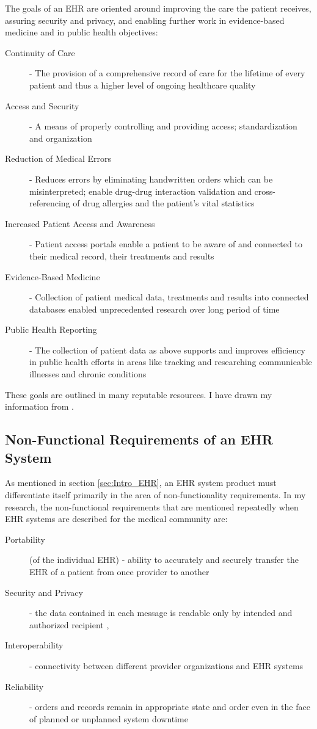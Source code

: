 \documentclass[10pt]{article}
\begin{document}
The goals of an EHR are oriented around improving the care the patient receives, assuring security and privacy, and enabling further work in evidence-based medicine and in public health objectives: 
\begin{description}
\item[Continuity of Care] - The provision of a comprehensive record of care for the lifetime of every patient and thus a higher level of ongoing healthcare quality
\item[Access and Security] - A means of properly controlling and providing access; standardization and organization
\item[Reduction of Medical Errors] - Reduces errors by eliminating handwritten orders which can be misinterpreted; enable drug-drug interaction validation and cross-referencing of drug allergies and the patient's vital statistics
\item[Increased Patient Access and Awareness] - Patient access portals enable a patient to be aware of and connected to their medical record, their treatments and results
\item[Evidence-Based Medicine] - Collection of patient medical data, treatments and results into connected databases enabled unprecedented research over long period of time
\item[Public Health Reporting] - The collection of patient data as above supports and improves efficiency in public health efforts in areas like tracking and researching communicable illnesses and chronic conditions
\end{description}

These goals are outlined in many reputable resources. I have drawn my information from \cite{ehrbook}.

\subsection{Non-Functional Requirements of an EHR System}
\label{sec:NFR of an EHR}

As mentioned in section \ref{sec:Intro_EHR}, an EHR system product must differentiate itself primarily in the area of non-functionality requirements.
In my research, the non-functional requirements that are mentioned repeatedly when EHR systems are described for the medical community are:
\begin{description}
	\item[Portability] (of the individual EHR) - ability to accurately and securely transfer the EHR of a patient from once provider to another \cite{ehrbook}
	\item[Security and Privacy] - the data contained in each message is readable only by intended and authorized recipient \cite{ehrbook}, \cite{auditingprivacy}
	\item[Interoperability] - connectivity between different provider organizations and EHR systems \cite{ehrbook}
	\item[Reliability] - orders and records remain in appropriate state and order even in the face of planned or unplanned system downtime  \cite{ehrbook}
\end{description}
\end{document}
